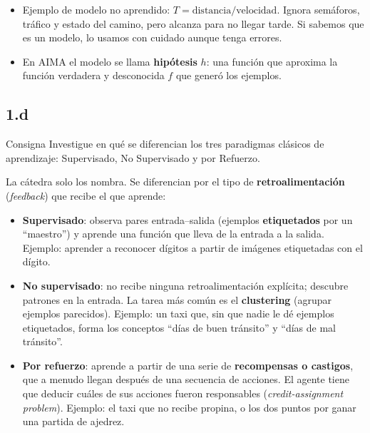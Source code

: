 \documentclass[11pt,a4paper]{article}
\begin{document}
\begin{extras}
\begin{itemize}
  \item Ejemplo de modelo no aprendido: $T = \text{distancia}/\text{velocidad}$. Ignora semáforos, tráfico y estado del camino, pero alcanza para no llegar tarde. Si sabemos que es un modelo, lo usamos con cuidado aunque tenga errores.
  \item En AIMA el modelo se llama \textbf{hipótesis} $h$: una función que aproxima la función verdadera y desconocida $f$ que generó los ejemplos. 
\end{itemize}
\end{extras}

\subsection{1.d}

\begin{enunciado}{Consigna}
Investigue en qué se diferencian los tres paradigmas clásicos de aprendizaje: Supervisado, No Supervisado y por Refuerzo.
\end{enunciado}

La cátedra solo los nombra. Se diferencian por el tipo de \textbf{retroalimentación} (\textit{feedback}) que recibe el que aprende:
\begin{itemize}
  \item \textbf{Supervisado}: observa pares entrada--salida (ejemplos \textbf{etiquetados} por un ``maestro'') y aprende una función que lleva de la entrada a la salida. Ejemplo: aprender a reconocer dígitos a partir de imágenes etiquetadas con el dígito.
  \item \textbf{No supervisado}: no recibe ninguna retroalimentación explícita; descubre patrones en la entrada. La tarea más común es el \textbf{clustering} (agrupar ejemplos parecidos). Ejemplo: un taxi que, sin que nadie le dé ejemplos etiquetados, forma los conceptos ``días de buen tránsito'' y ``días de mal tránsito''.
  \item \textbf{Por refuerzo}: aprende a partir de una serie de \textbf{recompensas o castigos}, que a menudo llegan después de una secuencia de acciones. El agente tiene que deducir cuáles de sus acciones fueron responsables (\textit{credit-assignment problem}). Ejemplo: el taxi que no recibe propina, o los dos puntos por ganar una partida de ajedrez.
\end{itemize}
\end{document}
